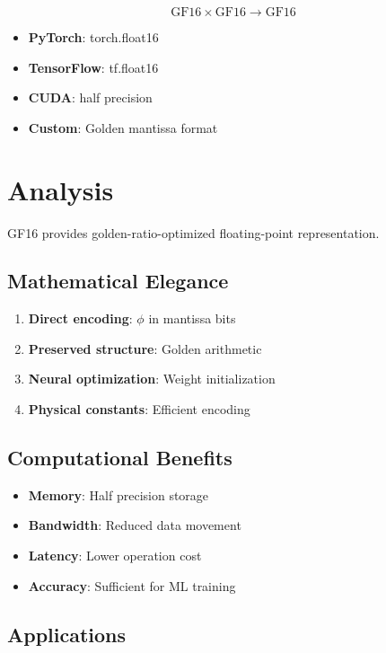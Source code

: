 \begin{equation}
\text{GF16} \times \text{GF16} \to \text{GF16}
\end{equation}

\begin{itemize}
\item \textbf{PyTorch}: torch.float16
\item \textbf{TensorFlow}: tf.float16
\item \textbf{CUDA}: half precision
\item \textbf{Custom}: Golden mantissa format
\end{itemize}

\section{Analysis}

GF16 provides golden-ratio-optimized floating-point representation.

\subsection{Mathematical Elegance}

\begin{enumerate}
\item \textbf{Direct encoding}: $\phi$ in mantissa bits
\item \textbf{Preserved structure}: Golden arithmetic
\item \textbf{Neural optimization}: Weight initialization
\item \textbf{Physical constants}: Efficient encoding
\end{enumerate}

\subsection{Computational Benefits}

\begin{itemize}
\item \textbf{Memory}: Half precision storage
\item \textbf{Bandwidth}: Reduced data movement
\item \textbf{Latency}: Lower operation cost
\item \textbf{Accuracy}: Sufficient for ML training
\end{itemize}

\subsection{Applications}

